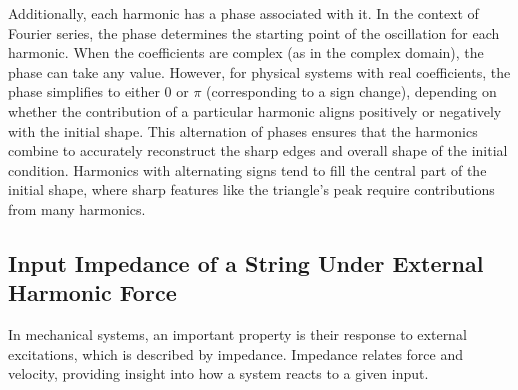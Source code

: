 \documentclass[a4paper]{article}
\begin{document}
Additionally, each harmonic has a phase associated with it. In the context of Fourier series, the phase determines the starting point of the oscillation for each harmonic. When the coefficients are complex (as in the complex domain), the phase can take any value. However, for physical systems with real coefficients, the phase simplifies to either 0 or \(\pi\) (corresponding to a sign change), depending on whether the contribution of a particular harmonic aligns positively or negatively with the initial shape. This alternation of phases ensures that the harmonics combine to accurately reconstruct the sharp edges and overall shape of the initial condition. Harmonics with alternating signs tend to fill the central part of the initial shape, where sharp features like the triangle's peak require contributions from many harmonics.

\subsection{Input Impedance of a String Under External Harmonic Force}

In mechanical systems, an important property is their response to external excitations, which is described by impedance. Impedance relates force and velocity, providing insight into how a system reacts to a given input.\\
\end{document}
